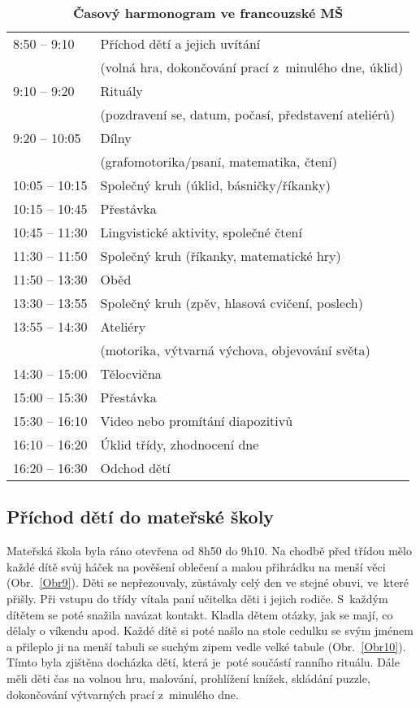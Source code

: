 \begin{spacing}{1.0}
	\begin{table}[h!]
		\center
		\begin{tabular}{|l l|}
			\hline
			\rowcolor{grey!0}
			8:50 – 9:10 		& Příchod dětí a jejich uvítání 						\\
								& (volná hra, dokončování prací z minulého dne, úklid) 	\\
			9:10 – 9:20			& Rituály 												\\
								& (pozdravení se, datum, počasí, představení ateliérů) 	\\
			9:20 – 10:05		& Dílny 												\\
								& (grafomotorika/psaní, matematika, čtení) 				\\
			10:05 – 10:15		& Společný kruh (úklid, básničky/říkanky) 				\\
			10:15 – 10:45		& Přestávka 											\\
			10:45 – 11:30		& Lingvistické aktivity, společné čtení 				\\
			11:30 – 11:50		& Společný kruh (říkanky, matematické hry) 				\\
			11:50 – 13:30		& Oběd 													\\
			13:30 – 13:55		& Společný kruh (zpěv, hlasová cvičení, poslech) 		\\
			13:55 – 14:30		& Ateliéry 												\\
								&(motorika, výtvarná výchova, objevování světa) 		\\
			14:30 – 15:00		& Tělocvična 											\\
			15:00 – 15:30		& Přestávka 											\\
			15:30 – 16:10		& Video nebo promítání diapozitivů 						\\
			16:10 – 16:20		& Úklid třídy, zhodnocení dne 							\\
			16:20 – 16:30		& Odchod dětí 											\\
			\hline
		\end{tabular}
		\caption{ \textbf{Časový harmonogram ve francouzské MŠ}	
		}
		\label{tab:rezimDneFR}
	\end{table}
	\end{spacing}

		\subsection{Příchod dětí do mateřské školy}
		\label{prichod}
			Mateřská škola byla ráno otevřena od 8h50 do 9h10. Na chodbě před třídou mělo každé dítě svůj háček na pověšení oblečení a malou přihrádku na menší věci (Obr.~\ref{Obr9}). Děti se nepřezouvaly, zůstávaly celý den ve stejné obuvi, ve které přišly. Při vstupu do třídy vítala paní učitelka děti i jejich rodiče. S každým dítětem se poté snažila navázat kontakt. Kladla dětem otázky, jak se mají, co dělaly o víkendu apod. Každé dítě si poté našlo na stole cedulku se svým jménem a přileplo ji na menší tabuli se suchým zipem vedle velké tabule (Obr.~\ref{Obr10}). Tímto byla zjištěna docházka dětí, která je poté součástí ranního rituálu. Dále měli děti čas na volnou hru, malování, prohlížení knížek, skládání puzzle, dokončování výtvarných prací z minulého dne.
		
